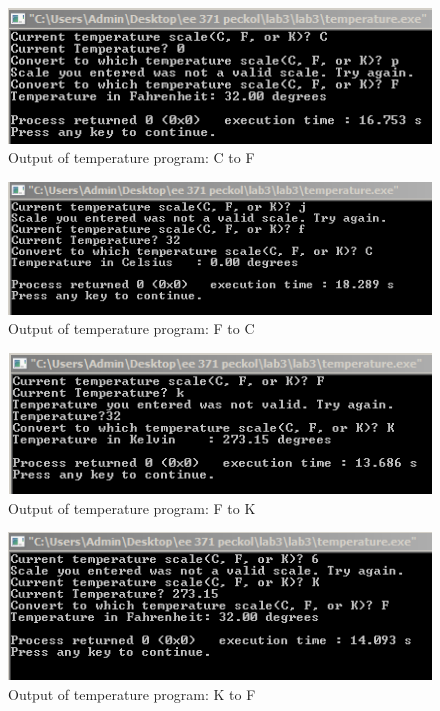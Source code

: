 \documentclass{article}
\begin{document}
    \begin{figure}[H]
      \centering
      \includegraphics[width=0.75\linewidth]{figures/c/temp_CtoF.png}
      \caption{Output of temperature program: C to F}
      \label{fig:tempConv_CtoF}
    \end{figure}

    \begin{figure}[H]
      \centering
      \includegraphics[width=0.75\linewidth]{figures/c/temp_FtoC.png}
      \caption{Output of temperature program: F to C}
      \label{fig:tempConv_FtoC}
    \end{figure}

    \begin{figure}[H]
      \centering
      \includegraphics[width=0.75\linewidth]{figures/c/temp_FtoK.png}
      \caption{Output of temperature program: F to K}
      \label{fig:tempConv_FtoK}
    \end{figure}

    \begin{figure}[H]
      \centering
      \includegraphics[width=0.75\linewidth]{figures/c/temp_KtoF.png}
      \caption{Output of temperature program: K to F}
      \label{fig:tempConv_KtoF}
    \end{figure}
\end{document}
